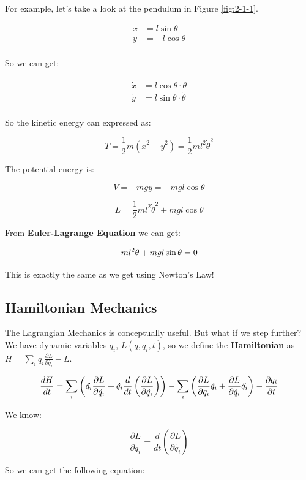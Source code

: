 For example, let's take a look at the pendulum in Figure \ref{fig:2-1-1}.

\begin{align*}
    x &= l \sin{\theta} \\
    y &= -l \cos{\theta} \\
\end{align*}

So we can get:

\begin{align*}
    \dot{x} &= l \cos{\theta} \cdot \dot{\theta} \\
    \dot{y} &= l \sin{\theta} \cdot \dot{\theta} \\
\end{align*}

So the kinetic energy can expressed as:

\[
    T=\frac{1}{2} m \left(\dot{x}^2+\dot{y}^2\right) = \frac{1}{2} ml^2\dot{\theta}^2
\]

The potential energy is:

\[
    V=-mgy=-mgl\cos{\theta}
\]

\[
    L=\frac{1}{2}ml^2\dot{\theta}^2+mgl\cos{\theta}
\]

From \textbf{Euler-Lagrange Equation} we can get:

\[
    ml^2\Ddot{\theta}+mgl\sin{\theta}=0
\]

This is exactly the same as we get using Newton's Law!

\subsection{Hamiltonian Mechanics}

The Lagrangian Mechanics is conceptually useful. But what if we step further? We have dynamic variables $q_i$, $L(q, q_i, t)$, so we define the \textbf{Hamiltonian} as $H=\sum_i \dot{q_i} \frac{\partial L}{\partial \dot{q_i}} - L$.

\[
    \frac{dH}{dt}=\sum_i \left(\Ddot{q_i} \frac{\partial L}{\partial \dot{q_i}} + \dot{q_i} \frac{d}{dt} \left(\frac{\partial L}{\partial \dot{q_i}}\right)\right) - \sum_i \left(\frac{\partial L}{\partial q_i} \dot{q_i} + \frac{\partial L}{\partial \dot{q_i}} \Ddot{q_i} \right) - \frac{\partial q_i}{\partial t}
\]

We know:

\[
    \frac{\partial L}{\partial q_i}=\frac{d}{dt} \left(\frac{\partial L}{\partial \dot{q_i}}\right)
\]

So we can get the following equation:

